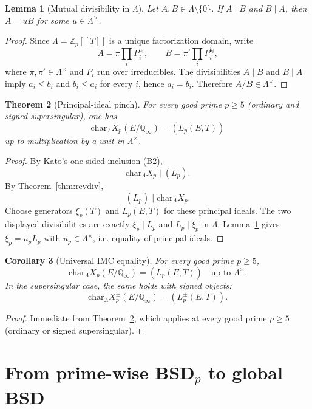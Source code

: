 \documentclass[12pt,reqno]{amsart}
\newtheorem{theorem}{Theorem}[section]
\newtheorem{lemma}[theorem]{Lemma}
\newtheorem{corollary}[theorem]{Corollary}
\theoremstyle{definition}
\theoremstyle{remark}
\newcommand{\Q}{\mathbb{Q}}
\newcommand{\Zp}{\mathbb{Z}_p}
\newcommand{\Qinf}{\Q_\infty}
\newcommand{\Lam}{\Lambda}
\newcommand{\chr}{\mathrm{char}}
\begin{document}
\begin{lemma}[Mutual divisibility in $\Lam$]\label{lem:mutual-div}
Let $A,B\in\Lam\setminus\{0\}$.  If $A\mid B$ and $B\mid A$, then $A=uB$ for some $u\in\Lam^\times$.
\end{lemma}

\begin{proof}
Since $\Lam=\Zp[\![T]\!]$ is a unique factorization domain, write
\[
A=\pi\prod_i P_i^{a_i},\qquad B=\pi'\prod_i P_i^{b_i},
\]
where $\pi,\pi'\in\Lam^\times$ and $P_i$ run over irreducibles.  The divisibilities $A\mid B$ and $B\mid A$ imply $a_i\le b_i$ and $b_i\le a_i$ for every $i$, hence $a_i=b_i$.  Therefore $A/B\in\Lam^\times$.
\end{proof}

\begin{theorem}[Principal-ideal pinch]\label{thm:schur-pinch}
For every good prime $p\ge 5$ (ordinary and signed supersingular), one has
\[
\chr_\Lam X_p(E/\Qinf)=(L_p(E,T))
\]
up to multiplication by a unit in $\Lam^\times$.
\end{theorem}

\begin{proof}
By Kato's one-sided inclusion (B2),
\[
\chr_\Lam X_p\mid (L_p).
\]
By Theorem~\ref{thm:revdiv},
\[
(L_p)\mid\chr_\Lam X_p.
\]
Choose generators $\xi_p(T)$ and $L_p(E,T)$ for these principal ideals.  The two displayed divisibilities are exactly $\xi_p\mid L_p$ and $L_p\mid\xi_p$ in $\Lam$.  Lemma~\ref{lem:mutual-div} gives $\xi_p=u_pL_p$ with $u_p\in\Lam^\times$, i.e. equality of principal ideals.
\end{proof}

\begin{corollary}[Universal IMC equality]\label{cor:universal-IMC}
For every good prime $p\ge 5$,
\[
\chr_\Lam X_p(E/\Qinf)=(L_p(E,T))\quad\text{up to }\Lam^\times.
\]
In the supersingular case, the same holds with signed objects:
\[
\chr_\Lam X_p^{\pm}(E/\Qinf)=(L_p^{\pm}(E,T)).
\]
\end{corollary}

\begin{proof}
Immediate from Theorem~\ref{thm:schur-pinch}, which applies at every good prime $p\ge 5$ (ordinary or signed supersingular).
\end{proof}

\section{From prime-wise BSD$_p$ to global BSD}\label{sec:global}
\end{document}
